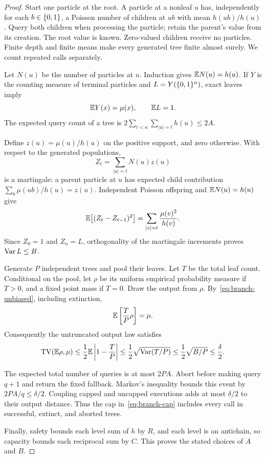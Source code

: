 \begin{proof}
Start one particle at the root. A particle at a nonleaf $u$ has, independently for each $b\in\{0,1\}$, a Poisson number of children at $ub$ with mean $h(ub)/h(u)$. Query both children when processing the particle; retain the parent's value from its creation. The root value is known. Zero-valued children receive no particles. Finite depth and finite means make every generated tree finite almost surely. We count repeated calls separately.

Let $N(u)$ be the number of particles at $u$. Induction gives $\mathbb E N(u)=h(u)$. If $Y$ is the counting measure of terminal particles and $L=Y(\{0,1\}^n)$, exact leaves imply
\begin{equation}\label{eq:branch-unbiased}
 \mathbb E Y(x)=\mu(x),\qquad \mathbb E L=1.
\end{equation}
The expected query count of a tree is $2\sum_{t<n}\sum_{|u|=t}h(u)\le2A$.

Define $z(u)=\mu(u)/h(u)$ on the positive support, and zero otherwise. With respect to the generated populations,
\[
 Z_t=\sum_{|u|=t}N(u)z(u)
\]
is a martingale: a parent particle at $u$ has expected child contribution $\sum_b\mu(ub)/h(u)=z(u)$. Independent Poisson offspring and $\mathbb E N(u)=h(u)$ give
\[
 \mathbb E\bigl[(Z_t-Z_{t-1})^2\bigr]
 =\sum_{|v|=t}\frac{\mu(v)^2}{h(v)}.
\]
Since $Z_0=1$ and $Z_n=L$, orthogonality of the martingale increments proves $\operatorname{Var} L\le B$.

Generate $P$ independent trees and pool their leaves. Let $T$ be the total leaf count. Conditional on the pool, let $\rho$ be its uniform empirical probability measure if $T>0$, and a fixed point mass if $T=0$. Draw the output from $\rho$. By~\eqref{eq:branch-unbiased}, including extinction,
\[
 \mathbb E\left[\frac{T}{P}\rho\right]=\mu.
\]
Consequently the untruncated output law satisfies
\[
 \operatorname{TV}(\mathbb E\rho,\mu)
 \le\frac12\mathbb E\left|1-\frac TP\right|
 \le\frac12\sqrt{\operatorname{Var}(T/P)}
 \le\frac12\sqrt{B/P}\le\frac\delta2.
\]

The expected total number of queries is at most $2PA$. Abort before making query $q+1$ and return the fixed fallback. Markov's inequality bounds this event by $2PA/q\le\delta/2$. Coupling capped and uncapped executions adds at most $\delta/2$ to their output distance. Thus the cap in~\eqref{eq:branch-cap} includes every call in successful, extinct, and aborted trees.

Finally, safety bounds each level sum of $h$ by $R$, and each level is an antichain, so capacity bounds each reciprocal sum by $C$. This proves the stated choices of $A$ and $B$.
\end{proof}
